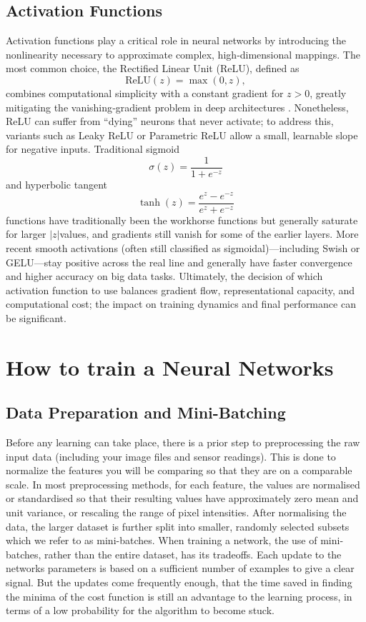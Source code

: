     \subsection{Activation Functions}
    Activation functions play a critical role in neural networks by introducing the nonlinearity necessary to approximate complex, high‐dimensional mappings. The most common choice, the Rectified Linear Unit (ReLU), defined as 
    \[
    \mathrm{ReLU}(z)=\max(0,z),
    \]
    combines computational simplicity with a constant gradient for \(z>0\), greatly mitigating the vanishing‐gradient problem in deep architectures \cite{nair2010rectified}. Nonetheless, ReLU can suffer from “dying” neurons that never activate; to address this, variants such as Leaky ReLU or Parametric ReLU allow a small, learnable slope for negative inputs. Traditional sigmoid 
    \[
    \sigma(z)=\frac{1}{1+e^{-z}}
    \]
    and hyperbolic tangent 
    \[
    \tanh(z)=\frac{e^z-e^{-z}}{e^z+e^{-z}}
    \]
     functions have traditionally been the workhorse functions but generally saturate for larger  \(|z|\)values, and gradients still vanish for some of the earlier layers. More recent smooth activations (often still classified as sigmoidal)—including Swish or GELU—stay positive across the real line and generally have faster convergence and higher accuracy on big data tasks. Ultimately, the decision of which activation function to use balances gradient flow, representational capacity, and computational cost; the impact on training dynamics and final performance can be significant.  













\section{How to train a Neural Networks}

    \subsection{Data Preparation and Mini-Batching}
    Before any learning can take place, there is a prior step to preprocessing the raw input data (including your image files and sensor readings). This is done to normalize the features you will be comparing so that they are on a comparable scale. In most preprocessing methods, for each feature, the values are normalised or standardised so that their resulting values have approximately zero mean and unit variance, or rescaling the range of pixel intensities. After normalising the data, the larger dataset is further split into smaller, randomly selected subsets which we refer to as mini-batches. When training a network, the use of mini-batches, rather than the entire dataset, has its tradeoffs. Each update to the networks parameters is based on a sufficient number of examples to give a clear signal. But the updates come frequently enough, that the time saved in finding the minima of the cost function is still an advantage to the learning process, in terms of a low probability for the algorithm to become stuck.
    
